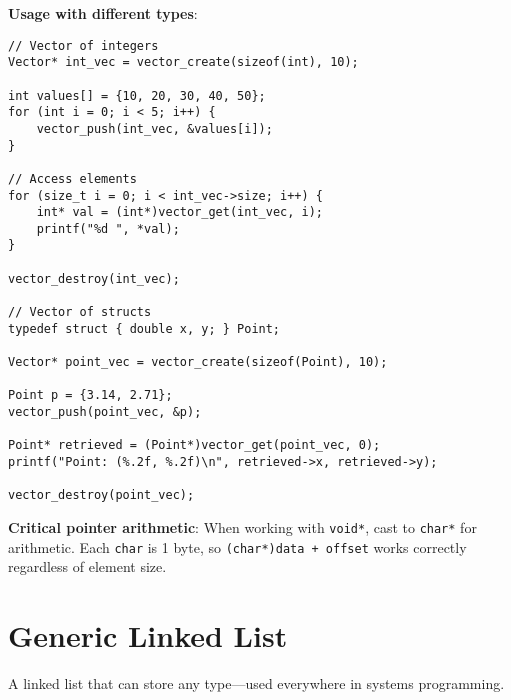 \textbf{Usage with different types}:

\begin{lstlisting}
// Vector of integers
Vector* int_vec = vector_create(sizeof(int), 10);

int values[] = {10, 20, 30, 40, 50};
for (int i = 0; i < 5; i++) {
    vector_push(int_vec, &values[i]);
}

// Access elements
for (size_t i = 0; i < int_vec->size; i++) {
    int* val = (int*)vector_get(int_vec, i);
    printf("%d ", *val);
}

vector_destroy(int_vec);

// Vector of structs
typedef struct { double x, y; } Point;

Vector* point_vec = vector_create(sizeof(Point), 10);

Point p = {3.14, 2.71};
vector_push(point_vec, &p);

Point* retrieved = (Point*)vector_get(point_vec, 0);
printf("Point: (%.2f, %.2f)\n", retrieved->x, retrieved->y);

vector_destroy(point_vec);
\end{lstlisting}

\textbf{Critical pointer arithmetic}: When working with \texttt{void*}, cast to \texttt{char*} for arithmetic. Each \texttt{char} is 1 byte, so \texttt{(char*)data + offset} works correctly regardless of element size.

\section{Generic Linked List}

A linked list that can store any type—used everywhere in systems programming.

